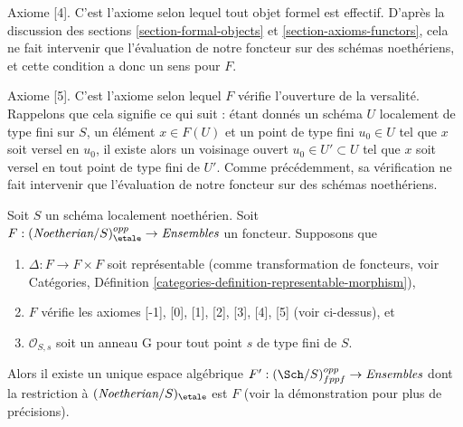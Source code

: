 \medskip\noindent
Axiome [4]. C'est l'axiome selon lequel tout objet formel est effectif.
D'après la discussion des
sections \ref{section-formal-objects} et \ref{section-axioms-functors},
cela ne fait intervenir que l'évaluation de notre foncteur sur des schémas noethériens,
et cette condition a donc un sens pour $F$.

\medskip\noindent
Axiome [5]. C'est l'axiome selon lequel $F$ vérifie l'ouverture de la versalité.
Rappelons que cela signifie ce qui suit : étant donnés un schéma $U$
localement de type fini sur $S$, un élément $x \in F(U)$ et
un point de type fini $u_0 \in U$ tel que $x$ soit versel en $u_0$,
il existe alors un voisinage ouvert $u_0 \in U' \subset U$
tel que $x$ soit versel en tout point de type fini de $U'$.
Comme précédemment, sa vérification ne fait intervenir que l'évaluation
de notre foncteur sur des schémas noethériens.

\begin{proposition}
\label{proposition-spaces-diagonal-representable-noetherian}
Soit $S$ un schéma localement noethérien. Soit
$F : (\textit{Noetherian}/S)_\etale^{opp} \to \textit{Ensembles}$
un foncteur. Supposons que
\begin{enumerate}
\item $\Delta : F \to F \times F$ soit représentable
(comme transformation de foncteurs, voir
Catégories, Définition \ref{categories-definition-representable-morphism}),
\item $F$ vérifie les axiomes [-1], [0], [1], [2], [3], [4], [5]
(voir ci-dessus), et
\item $\mathcal{O}_{S, s}$ soit un anneau G pour tout point $s$ de type fini de $S$.
\end{enumerate}
Alors il existe un unique espace algébrique
$F' : (\Sch/S)_{fppf}^{opp} \to \textit{Ensembles}$
dont la restriction à $(\textit{Noetherian}/S)_\etale$ est $F$
(voir la démonstration pour plus de précisions).
\end{proposition}

